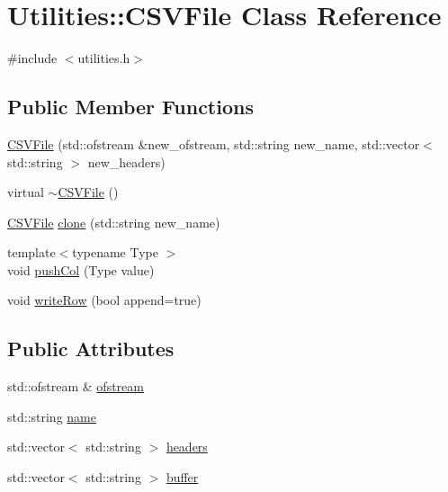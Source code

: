 \hypertarget{classUtilities_1_1CSVFile}{}\section{Utilities\+:\+:C\+S\+V\+File Class Reference}
\label{classUtilities_1_1CSVFile}


{\ttfamily \#include $<$utilities.\+h$>$}

\subsection*{Public Member Functions}
\begin{DoxyCompactItemize}
\item 
\hyperlink{classUtilities_1_1CSVFile_a35c6dd1a71618229cdd5f5e1ca6de4e9}{C\+S\+V\+File} (std\+::ofstream \&new\+\_\+ofstream, std\+::string new\+\_\+name, std\+::vector$<$ std\+::string $>$ new\+\_\+headers)
\item 
virtual \hyperlink{classUtilities_1_1CSVFile_a4e90ae7fd8a4de6908aab2554eac76d0}{$\sim$\+C\+S\+V\+File} ()
\item 
\hyperlink{classUtilities_1_1CSVFile}{C\+S\+V\+File} \hyperlink{classUtilities_1_1CSVFile_a7394abaf33c2cf1bc557bba58cf0e453}{clone} (std\+::string new\+\_\+name)
\item 
{\footnotesize template$<$typename Type $>$ }\\void \hyperlink{classUtilities_1_1CSVFile_ad0fc6d028ca1010f6597fa9a18f3db7a}{push\+Col} (Type value)
\item 
void \hyperlink{classUtilities_1_1CSVFile_a592fc96c51382efb35c6708acbfa69c2}{write\+Row} (bool append=true)
\end{DoxyCompactItemize}
\subsection*{Public Attributes}
\begin{DoxyCompactItemize}
\item 
std\+::ofstream \& \hyperlink{classUtilities_1_1CSVFile_a3ceb6ad218bb1e729b03a51e326fc12b}{ofstream}
\item 
std\+::string \hyperlink{classUtilities_1_1CSVFile_a26f01db1cc36f242adf00b17b4f63e37}{name}
\item 
std\+::vector$<$ std\+::string $>$ \hyperlink{classUtilities_1_1CSVFile_a17822ae335f168e68498b8b1b69b8dbe}{headers}
\item 
std\+::vector$<$ std\+::string $>$ \hyperlink{classUtilities_1_1CSVFile_aa1ab5bfb37837aaba9b6cabd38c96bb3}{buffer}
\end{DoxyCompactItemize}


